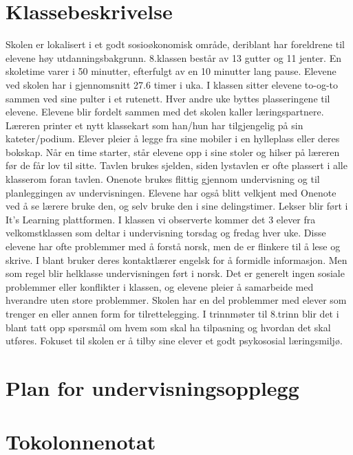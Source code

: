 \documentclass[main.tex]{subfiles}
\begin{document}
\appendix
\section{Klassebeskrivelse}
Skolen er lokalisert i et godt sosioøkonomisk område, deriblant har foreldrene til elevene høy
utdanningsbakgrunn. 8.klassen består av 13 gutter og 11 jenter. En skoletime varer i 50
minutter, efterfulgt av en 10 minutter lang pause. Elevene ved skolen har i gjennomsnitt 27.6
timer i uka. I klassen sitter elevene to-og-to sammen ved sine pulter i et rutenett. Hver andre
uke byttes plasseringene til elevene. Elevene blir fordelt sammen med det skolen kaller
læringspartnere. Læreren printer et nytt klassekart som han/hun har tilgjengelig på sin
kateter/podium. Elever pleier å legge fra sine mobiler i en hylleplass eller deres bokskap. Når en
time starter, står elevene opp i sine stoler og hilser på læreren før de får lov til sitte. Tavlen
brukes sjelden, siden lystavlen er ofte plassert i alle klasserom foran tavlen. Onenote brukes
flittig gjennom undervisning og til planleggingen av undervisningen. Elevene har også blitt
velkjent med Onenote ved å se lærere bruke den, og selv bruke den i sine delingstimer. Lekser
blir ført i It’s Learning plattformen. I klassen vi observerte kommer det 3 elever fra
velkomstklassen som deltar i undervisning torsdag og fredag hver uke. Disse elevene har ofte
problemmer med å forstå norsk, men de er flinkere til å lese og skrive. I blant bruker deres
kontaktlærer engelsk for å formidle informasjon. Men som regel blir helklasse undervisningen
ført i norsk. Det er generelt ingen sosiale problemmer eller konflikter i klassen, og elevene pleier
å samarbeide med hverandre uten store problemmer. Skolen har en del problemmer med
elever som trenger en eller annen form for tilrettelegging. I trinnmøter til 8.trinn blir det i blant tatt
opp spørsmål om hvem som skal ha tilpasning og hvordan det skal utføres. Fokuset til skolen er
å tilby sine elever et godt psykososial læringsmiljø.

\section{Plan for undervisningsopplegg}







\section{Tokolonnenotat}




\end{document}
